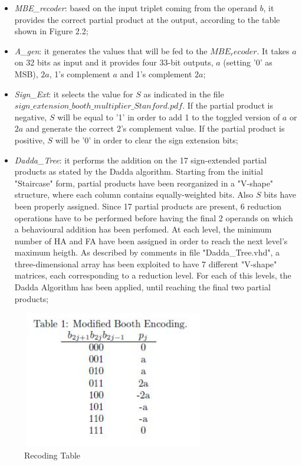 \begin{itemize}
 
\item \emph{MBE\_recoder}: based on the input triplet coming from the operand $b$, it provides the correct partial product 
at the output, according to the table shown in Figure 2.2;

\item \emph{A\_gen}: it generates the values that will be fed to the $MBE_recoder$. It takes
$a$ on 32 bits as input and it provides four 33-bit outputs, $a$ (setting '0' as MSB), $2a$,
1's complement $a$ and 1's complement $2a$;

\item \emph{Sign\_Ext}: it selects the value for $S$ as indicated in the file
$sign\_extension\_booth\_multiplier\_Stanford.pdf$. If the partial product is negative, $S$ will be 
equal to '1' in order to add 1 to the toggled version of $a$ or $2a$ and generate the correct
2's complement value. If the partial product is positive, $S$ will be '0' in order to clear
the sign extension bits;

\item \emph{Dadda\_Tree}: it performs the addition on the 17 sign-extended partial products as
stated by the Dadda algorithm. Starting from the initial "Staircase" form, partial products have
been reorganized in a "V-shape" structure, where each column contains equally-weighted bits. Also $S$
bits have been properly assigned. Since 17 partial products are present, 6 reduction operations have to be performed before having the final 2 operands on which a behavioural
addition has been perfomed. At each level, the minimum number of HA and FA have been assigned
in order to reach the next level's maximum heigth. As described by comments in file "Dadda\_Tree.vhd", a three-dimensional array has been exploited to have 7 different "V-shape" matrices, each corresponding to a reduction level. For each of this levels, the Dadda Algorithm has been applied, until reaching the final two partial products;

\end{itemize}


\begin{figure}[H]
	\centering
	\includegraphics[width=8cm, height=6cm]{img/MBE.jpeg} 
	\caption{Recoding Table}
	\label{Recoding Table} 
\end{figure}


